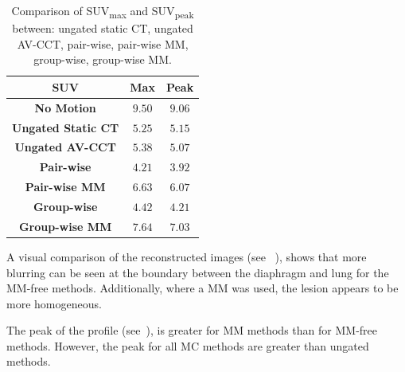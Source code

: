     \begin{table}
        \centering
        
        \captionsetup{singlelinecheck=false, justification=centering}
        \caption{Comparison of \gls{SUV}\textsubscript{max} and \gls{SUV}\textsubscript{peak} between: ungated static \gls{CT}, ungated \gls{AV-CCT}, pair-wise, pair-wise \gls{MM}, group-wise, group-wise \gls{MM}.}
        
        \resizebox*{1.0\linewidth}{!}
        {
            \begin{tabular}{||c|cc||}
                \hline
                \textbf{\gls{SUV}}                  & \textbf{Max}  & \textbf{Peak} \\
                \hline
                \textbf{No Motion}                  & $9.50$        & $9.06$ \\
                \hline
                \textbf{Ungated Static \gls{CT}}    & $5.25$        & $5.15$ \\
                \textbf{Ungated \gls{AV-CCT}}       & $5.38$        & $5.07$ \\
                \hline
                \textbf{Pair-wise}                  & $4.21$        & $3.92$ \\
                \textbf{Pair-wise \gls{MM}}         & $6.63$        & $6.07$ \\
                \hline
                \textbf{Group-wise}                 & $4.42$        & $4.21$ \\
                \textbf{Group-wise \gls{MM}}        & $7.64$        & $7.03$ \\
                \hline
            \end{tabular}
        }
        
        \label{tab:suv}
        
    \end{table}
    
    A visual comparison of the reconstructed images (see ~), shows that more blurring can be seen at the boundary between the diaphragm and lung for the \gls{MM}-free methods. Additionally, where a \gls{MM} was used, the lesion appears to be more homogeneous.
     
    The peak of the profile (see~), is greater for \gls{MM} methods than for \gls{MM}-free methods. However, the peak for all \gls{MC} methods are greater than ungated methods.
     
